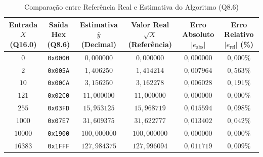 \documentclass[conference]{IEEEtran}
\begin{document}
\begin{table}[t]
	\caption{Comparação entre Referência Real e Estimativa do Algoritmo (Q8.6)}
	\label{tab:erros}
	\centering
	\footnotesize
	\setlength{\tabcolsep}{10pt}
	\begin{tabular}{cccccc}
		\toprule
		\textbf{Entrada $X$ (Q16.0)} & \textbf{Saída Hex (Q8.6)} & \textbf{Estimativa $\hat{y}$ (Decimal)} & \textbf{Valor Real $\sqrt{X}$ (Referência)} & \textbf{Erro Absoluto $|e_{\text{abs}}|$} & \textbf{Erro Relativo $|e_{\text{rel}}|$ (\%)} \\
		\midrule
		$0$                          & \texttt{0x0000}           & $0{,}000000$                            & $0{,}000000$                                & $0{,}000000$                              & $0{,}000\%$                                    \\
		$2$                          & \texttt{0x005A}           & $1{,}406250$                            & $1{,}414214$                                & $0{,}007964$                              & $0{,}563\%$                                    \\
		$10$                         & \texttt{0x00CA}           & $3{,}156250$                            & $3{,}162278$                                & $0{,}006028$                              & $0{,}191\%$                                    \\
		$121$                        & \texttt{0x02C0}           & $11{,}000000$                           & $11{,}000000$                               & $0{,}000000$                              & $0{,}000\%$                                    \\
		$255$                        & \texttt{0x03FD}           & $15{,}953125$                           & $15{,}968719$                               & $0{,}015594$                              & $0{,}098\%$                                    \\
		$1000$                       & \texttt{0x07E7}           & $31{,}609375$                           & $31{,}622777$                               & $0{,}013402$                              & $0{,}042\%$                                    \\
		$10000$                      & \texttt{0x1900}           & $100{,}000000$                          & $100{,}000000$                              & $0{,}000000$                              & $0{,}000\%$                                    \\
		$16383$                      & \texttt{0x1FFF}           & $127{,}984375$                          & $127{,}996094$                              & $0{,}011719$                              & $0{,}009\%$                                    \\
		\bottomrule
	\end{tabular}
\end{table}
\end{document}
